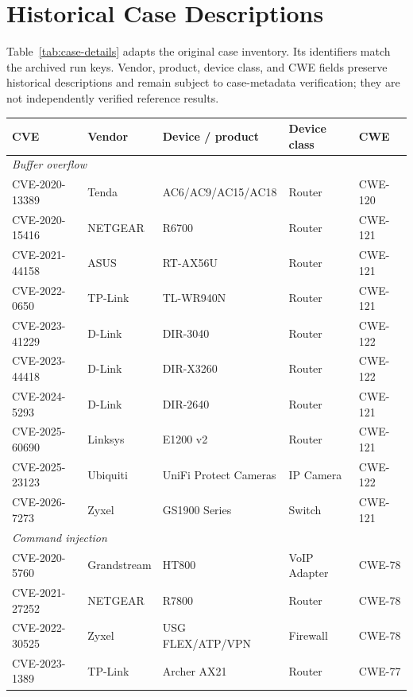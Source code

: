 \begin{table}[p]
\begin{minipage}{\textwidth}
\section{Historical Case Descriptions}
\label{app:case-inventory}
\label{app:cvelist}

Table~\ref{tab:case-details} adapts the original case inventory. Its
identifiers match the archived run keys. Vendor, product, device class,
and CWE fields preserve historical descriptions and remain subject to
case-metadata verification; they are not independently verified reference results.

\centering
\begin{tabular}{p{1.18in}p{0.72in}p{2.35in}p{0.98in}p{0.85in}}
\toprule
CVE & Vendor & Device / product & Device class & CWE \\
\midrule
\multicolumn{5}{l}{\textit{Buffer overflow}} \\
CVE-2020-13389 & Tenda & AC6/\allowbreak AC9/\allowbreak AC15/\allowbreak AC18 & Router & CWE-120 \\
CVE-2020-15416 & NETGEAR & R6700 & Router & CWE-121 \\
CVE-2021-44158 & ASUS & RT-AX56U & Router & CWE-121 \\
CVE-2022-0650 & TP-Link & TL-WR940N & Router & CWE-121 \\
CVE-2023-41229 & D-Link & DIR-3040 & Router & CWE-122 \\
CVE-2023-44418 & D-Link & DIR-X3260 & Router & CWE-122 \\
CVE-2024-5293 & D-Link & DIR-2640 & Router & CWE-121 \\
CVE-2025-60690 & Linksys & E1200 v2 & Router & CWE-121 \\
CVE-2025-23123 & Ubiquiti & UniFi Protect Cameras & IP Camera & CWE-122 \\
CVE-2026-7273 & Zyxel & GS1900 Series & Switch & CWE-121 \\
\midrule
\multicolumn{5}{l}{\textit{Command injection}} \\
CVE-2020-5760 & Grandstream & HT800 & VoIP Adapter & CWE-78 \\
CVE-2021-27252 & NETGEAR & R7800 & Router & CWE-78 \\
CVE-2022-30525 & Zyxel & USG FLEX/\allowbreak ATP/\allowbreak VPN & Firewall & CWE-78 \\
CVE-2023-1389 & TP-Link & Archer AX21 & Router & CWE-77 \\

\end{tabular}
\end{minipage}
\end{table}
